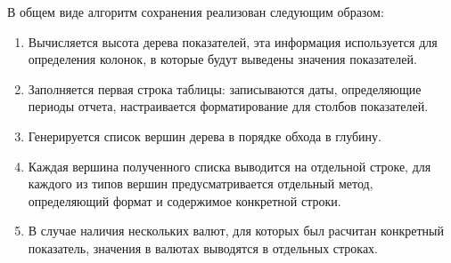 В общем виде алгоритм сохранения реализован следующим образом:
\begin{enumerate}
\item{
  Вычисляется высота дерева показателей, эта информация используется для определения колонок, в которые будут выведены
значения показателей.
}
\item{
  Заполняется первая строка таблицы: записываются даты, определяющие периоды отчета, настраивается форматирование
для столбов показателей.
}
\item{
  Генерируется список вершин дерева в порядке обхода в глубину.
}
\item{
  Каждая вершина полученного списка выводится на отдельной строке, для каждого из типов вершин
предусматривается отдельный метод, определяющий формат и содержимое конкретной строки.
}
\item{
  В случае наличия нескольких валют, для которых был расчитан конкретный показатель, значения в валютах выводятся в 
  отдельных строках.
}
\end{enumerate}

